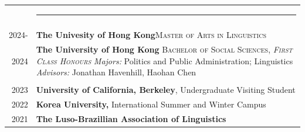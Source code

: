 \documentclass[letterpaper, 11pt]{article}
\newcommand{\headingfont}{\Large\color{black}}
\newenvironment{SectionTableSingleSpace}[1]{
	\renewcommand*{\arraystretch}{1.3}
	\setlength{\tabcolsep}{10pt}
	\begin{longtable}{Rp{6.3in}} & #1 \vspace{0.13cm}\hrule \\[0.6em] }
{\end{longtable}\vspace{-.3cm}}
\begin{document}
\begin{SectionTableSingleSpace}{\headingfont{\textbf{\textsc{Education}}}}
&{}\\


\raggedright{{2024-}} &
\textbf{The Univesity of Hong Kong}\newline \textsc{Master of Arts in Linguistics} \vspace{0.3cm}\\

\raggedright{{2024}} &
\textbf{The University of Hong Kong}\newline
\textsc{Bachelor of Social Sciences, \textit{First Class Honours}}\newline
\textit{Majors:} Politics and Public Administration; Linguistics\newline
\textit{Advisors:} Jonathan Havenhill, Haohan Chen \vspace{0.3cm}\\

&
{}\\

\raggedright{{2023}} &
\textbf{University of California, Berkeley}, Undergraduate Visiting Student \\
\raggedright{{2022}}&
\textbf{Korea University,} {International Summer and Winter Campus}\\
2021 &
\textbf{The Luso-Brazillian Association of Linguistics}\\


\end{SectionTableSingleSpace}
\end{document}
